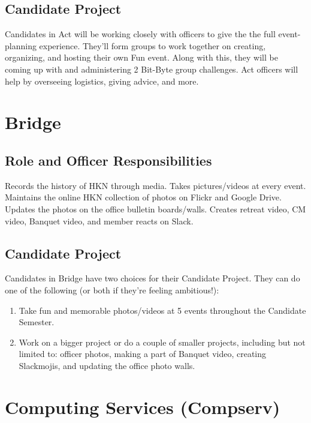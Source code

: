 \documentclass[11pt, article, oneside]{memoir}
\begin{document}
    \subsection{Candidate Project}
        Candidates in Act will be working closely with officers to give the the full event-planning experience.
        They'll form groups to work together on creating, organizing, and hosting their own Fun event.
        Along with this, they will be coming up with and administering 2 Bit-Byte group challenges.
        Act officers will help by overseeing logistics, giving advice, and more.
    
    \section{Bridge}
    \subsection{Role and Officer Responsibilities}
        Records the history of HKN through media.
        Takes pictures/videos at every event.
        Maintains the online HKN collection of photos on Flickr and Google Drive.
        Updates the photos on the office bulletin boards/walls.
        Creates retreat video, CM video, Banquet video, and member reacts on Slack.

    \subsection{Candidate Project}
        Candidates in Bridge have two choices for their Candidate Project.
        They can do one of the following (or both if they're feeling ambitious!):
        \begin{enumerate}
            \item Take fun and memorable photos/videos at 5 events throughout the Candidate Semester.
            \item Work on a bigger project or do a couple of smaller projects, including but not limited to: officer photos, making a part of Banquet video, creating Slackmojis, and updating the office photo walls.
        \end{enumerate}


    \section{Computing Services (Compserv)}
\end{document}
